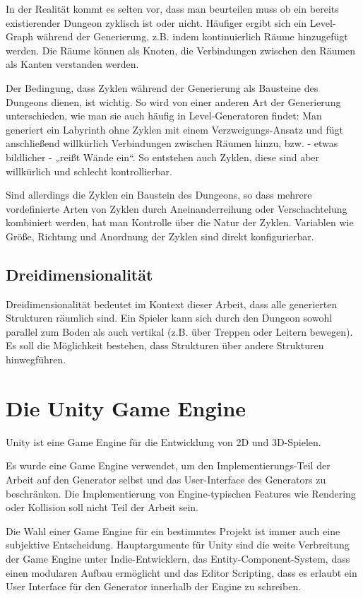 In der Realität kommt es selten vor, dass man beurteilen muss ob ein bereits existierender Dungeon zyklisch ist oder nicht. Häufiger ergibt sich ein Level-Graph während der Generierung, z.B. indem kontinuierlich Räume hinzugefügt werden. Die Räume können als Knoten, die Verbindungen zwischen den Räumen als Kanten verstanden werden.

Der Bedingung, dass Zyklen während der Generierung als Bausteine des Dungeons dienen, ist wichtig. So wird von einer anderen Art der Generierung unterschieden, wie man sie auch häufig in Level-Generatoren findet: Man generiert ein Labyrinth ohne Zyklen mit einem Verzweigungs-Ansatz und fügt anschließend willkürlich Verbindungen zwischen Räumen hinzu, bzw. - etwas bildlicher - „reißt Wände ein“. So entstehen auch Zyklen, diese sind aber willkürlich und schlecht kontrollierbar. 

Sind allerdings die Zyklen ein Baustein des Dungeons, so dass mehrere vordefinierte Arten von Zyklen durch Aneinanderreihung oder Verschachtelung kombiniert werden, hat man Kontrolle über die Natur der Zyklen. Variablen wie Größe, Richtung und Anordnung der Zyklen sind direkt konfigurierbar.

\subsection{Dreidimensionalität}

Dreidimensionalität bedeutet im Kontext dieser Arbeit, dass alle generierten Strukturen räumlich sind. Ein Spieler kann sich durch den Dungeon sowohl parallel zum Boden als auch vertikal (z.B. über Treppen oder Leitern bewegen). Es soll die Möglichkeit bestehen, dass Strukturen über andere Strukturen hinwegführen.

\section{Die Unity Game Engine}

Unity ist eine Game Engine für die Entwicklung von 2D und 3D-Spielen. 

Es wurde eine Game Engine verwendet, um den Implementierungs-Teil der Arbeit auf den Generator selbst und das User-Interface des Generators zu beschränken. Die Implementierung von Engine-typischen Features wie Rendering oder Kollision soll nicht Teil der Arbeit sein.

Die Wahl einer Game Engine für ein bestimmtes Projekt ist immer auch eine subjektive Entscheidung. Hauptargumente für Unity sind die weite Verbreitung der Game Engine unter Indie-Entwicklern, das Entity-Component-System, dass einen modularen Aufbau ermöglicht und das Editor Scripting, dass es erlaubt ein User Interface für den Generator innerhalb der Engine zu schreiben. 


